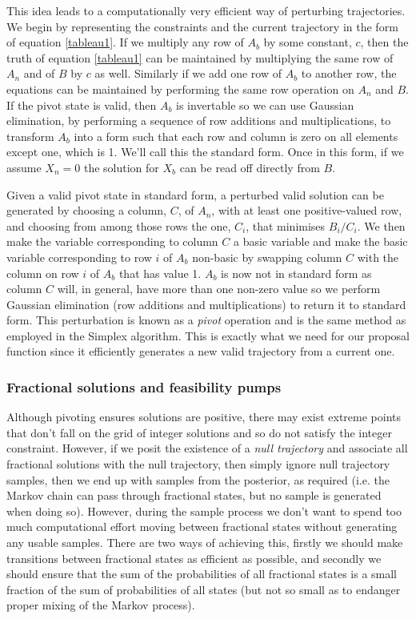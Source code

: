 This idea leads to a computationally very efficient way of perturbing trajectories. We begin by representing the constraints and the current trajectory in the form of equation \ref{tableau1}. If we multiply any row of $A_b$ by some constant, $c$, then the truth of equation \ref{tableau1} can be maintained by multiplying the same row of $A_n$ and of $B$ by $c$ as well. Similarly if we add one row of $A_b$ to another row, the equations can be maintained by performing the same row operation on $A_n$ and $B$. If the pivot state is valid, then $A_b$ is invertable so we can use Gaussian elimination, by performing a sequence of row additions and multiplications, to transform $A_b$ into a form such that each row and column is zero on all elements except one, which is 1. We'll call this the standard form. Once in this form, if we assume $X_n = 0$ the solution for $X_b$ can be read off directly from $B$.

Given a valid pivot state in standard form, a perturbed valid solution can be generated by choosing a column, $C$, of $A_n$, with at least one positive-valued row, and choosing from among those rows the one, $C_i$, that minimises $B_i/C_i$. We then make the variable corresponding to column $C$ a basic variable and make the basic variable corresponding to row $i$ of $A_b$ non-basic by swapping column $C$ with the column on row $i$ of $A_b$ that has value 1. $A_b$ is now not in standard form as column $C$ will, in general, have more than one non-zero value so we perform Gaussian elimination (row additions and multiplications) to return it to standard form. This perturbation is known as a \textit{pivot} operation and is the same method as employed in the Simplex algorithm\cite{dantzig1955generalized}\cite{vanderbei2015linear}. This is exactly what we need for our proposal function since it efficiently generates a new valid trajectory from a current one.

\subsubsection{Fractional solutions and feasibility pumps}

Although pivoting ensures solutions are positive, there may exist extreme points that don't fall on the grid of integer solutions and so do not satisfy the integer constraint. However, if we posit the existence of a \textit{null trajectory} and associate all fractional solutions with the null trajectory, then simply ignore null trajectory samples, then we end up with samples from the posterior, as required (i.e. the Markov chain can pass through fractional states, but no sample is generated when doing so). However, during the sample process we don't want to spend too much computational effort moving between fractional states without generating any usable samples. There are two ways of achieving this, firstly we should make transitions between fractional states as efficient as possible, and secondly we should ensure that the sum of the probabilities of all fractional states is a small fraction of the sum of probabilities of all states (but not so small as to endanger proper mixing of the Markov process).

